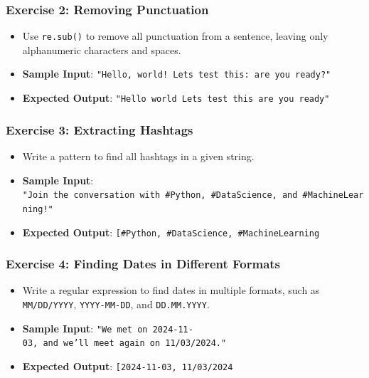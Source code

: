 \documentclass[
  letterpaper,
  DIV=11,
  numbers=noendperiod]{scrreprt}
\providecommand{\tightlist}{%
  \setlength{\itemsep}{0pt}\setlength{\parskip}{0pt}}\usepackage{longtable,booktabs,array}
\begin{document}
\hypertarget{exercise-2-removing-punctuation}{%
\subsubsection{Exercise 2: Removing
Punctuation}\label{exercise-2-removing-punctuation}}

\begin{itemize}
\tightlist
\item
  Use \texttt{re.sub()} to remove all punctuation from a sentence,
  leaving only alphanumeric characters and spaces.
\item
  \textbf{Sample Input}:
  \texttt{"Hello,\ world!\ Let\textquotesingle{}s\ test\ this:\ are\ you\ ready?"}
\item
  \textbf{Expected Output}:
  \texttt{"Hello\ world\ Lets\ test\ this\ are\ you\ ready"}
\end{itemize}

\hypertarget{exercise-3-extracting-hashtags}{%
\subsubsection{Exercise 3: Extracting
Hashtags}\label{exercise-3-extracting-hashtags}}

\begin{itemize}
\tightlist
\item
  Write a pattern to find all hashtags in a given string.
\item
  \textbf{Sample Input}:
  \texttt{"Join\ the\ conversation\ with\ \#Python,\ \#DataScience,\ and\ \#MachineLearning!"}
\item
  \textbf{Expected Output}:
  \texttt{{[}\textquotesingle{}\#Python\textquotesingle{},\ \textquotesingle{}\#DataScience\textquotesingle{},\ \textquotesingle{}\#MachineLearning\textquotesingle{}{]}}
\end{itemize}

\hypertarget{exercise-4-finding-dates-in-different-formats}{%
\subsubsection{Exercise 4: Finding Dates in Different
Formats}\label{exercise-4-finding-dates-in-different-formats}}

\begin{itemize}
\tightlist
\item
  Write a regular expression to find dates in multiple formats, such as
  \texttt{MM/DD/YYYY}, \texttt{YYYY-MM-DD}, and \texttt{DD.MM.YYYY}.
\item
  \textbf{Sample Input}:
  \texttt{"We\ met\ on\ 2024-11-03,\ and\ we’ll\ meet\ again\ on\ 11/03/2024."}
\item
  \textbf{Expected Output}:
  \texttt{{[}\textquotesingle{}2024-11-03\textquotesingle{},\ \textquotesingle{}11/03/2024\textquotesingle{}{]}}
\end{itemize}
\end{document}
